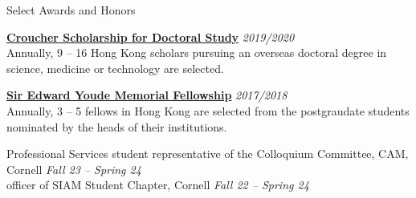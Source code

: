 \documentclass{resume} %
\begin{document}
\begin{rSection}{Select Awards and Honors}

\href{https://scholars.croucher.org.hk/scholars/siu-chun-yin}{\textbf{Croucher Scholarship for Doctoral Study}} \hfill {\em 2019/2020}\\
Annually, 9 -- 16 Hong Kong scholars pursuing an overseas doctoral degree in science, medicine or technology are selected.

\href{https://www.wfsfaa.gov.hk/sfo/seymf/en/index.htm}{\textbf{Sir Edward Youde Memorial Fellowship}} \hfill {\em 2017/2018}\\
Annually, 3 -- 5 fellows in Hong Kong are selected from the postgraudate students nominated by the heads of their institutions.

\end{rSection}

\begin{rSection}{Professional Services}
student representative of the Colloquium Committee, CAM, Cornell \hfill {\em Fall 23 -- Spring 24} \\
officer of SIAM Student Chapter, Cornell \hfill {\em Fall 22 -- Spring 24}
\end{rSection}
\end{document}
